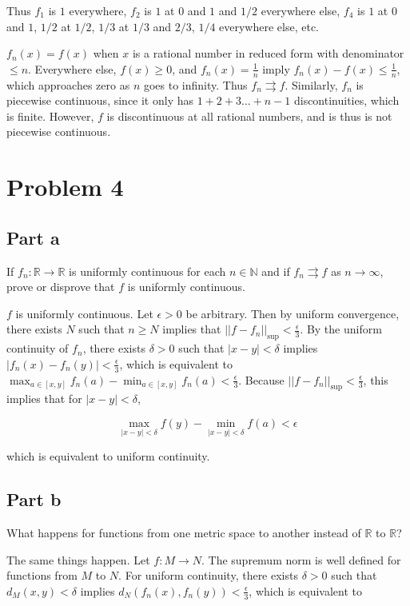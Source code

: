\documentclass{article}
\newcommand{\R}{\mathbb{R}}
\newcommand{\N}{\mathbb{N}}
\begin{document}
Thus $f_1$ is $1$ everywhere, $f_2$ is $1$ at $0$ and $1$ and $1/2$ everywhere else, $f_4$ is $1$ at $0$ and $1$, $1/2$ at $1/2$, $1/3$ at $1/3$ and $2/3$, $1/4$ everywhere else, etc.

$f_n(x) = f(x)$ when $x$ is a rational number in reduced form with denominator $\leq n$. Everywhere else, $f(x) \geq 0$, and $f_n(x) = \frac{1}{n}$ imply $f_n(x) - f(x) \leq \frac{1}{n}$, which approaches zero as $n$ goes to infinity. Thus $f_n \rightrightarrows f$. Similarly, $f_n$ is piecewise continuous, since it only has $1 + 2 + 3 \dots + n-1$ discontinuities, which is finite. However, $f$ is discontinuous at all rational numbers, and is thus is not piecewise continuous.

\section*{Problem 4}

\subsection*{Part a}

If $f_n: \R \rightarrow \R$ is uniformly continuous for each $n \in \N$ and if $f_n \rightrightarrows f$ as $n \rightarrow \infty$, prove or disprove that $f$ is uniformly continuous.

$f$ is uniformly continuous. Let $\epsilon > 0$ be arbitrary. Then by uniform convergence, there exists $N$ such that $n \geq N$ implies that $||f - f_n||_{\sup} < \frac{\epsilon}{3}$. By the uniform continuity of $f_n$, there exists $\delta > 0$ such that $|x - y| < \delta$ implies $|f_n(x) - f_n(y)| < \frac{\epsilon}{3}$, which is equivalent to $\max_{a \in [x, y]} f_n(a) - \min_{a \in [x, y]} f_n(a) < \frac{\epsilon}{3}$. Because $||f - f_n||_{\sup} < \frac{\epsilon}{3}$, this implies that for $|x-y| < \delta$,

\[
\max_{|x-y| < \delta} f(y) - \min_{|x-y| < \delta} f(a) < \epsilon
\]

which is equivalent to uniform continuity.

\subsection*{Part b}

What happens for functions from one metric space to another instead of $\R$ to $\R$?

The same things happen. Let $f: M \rightarrow N$. The supremum norm is well defined for functions from $M$ to $N$. For uniform continuity, there exists $\delta > 0$ such that $d_M(x, y) < \delta$ implies $d_N(f_n(x), f_n(y)) < \frac{\epsilon}{3}$, which is equivalent to
\end{document}
